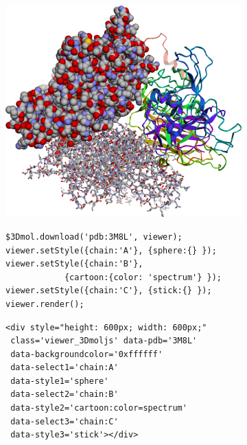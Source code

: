 \documentclass[]{bioinfo}
\begin{document}
\begin{figure}
        \captionsetup[subfigure]{aboveskip=-1pt}
\centering
\begin{minipage}[b]{.9\linewidth}
\begin{subfigure}[b]{\linewidth} \centering
\includegraphics[width=\linewidth]{screenshot}
\caption{}\label{pic}
\end{subfigure} %
\end{minipage}
\begin{minipage}[b]{\linewidth}
\begin{subfigure}[b]{\linewidth} \centering
\begin{verbatim}
$3Dmol.download('pdb:3M8L', viewer);
viewer.setStyle({chain:'A'}, {sphere:{} });
viewer.setStyle({chain:'B'}, 
            {cartoon:{color: 'spectrum'} });
viewer.setStyle({chain:'C'}, {stick:{} });
viewer.render();
\end{verbatim}
\caption{}\label{code}
\end{subfigure} %
\begin{subfigure}[b]{\linewidth} \centering
\begin{verbatim}
<div style="height: 600px; width: 600px;" 
 class='viewer_3Dmoljs' data-pdb='3M8L'
 data-backgroundcolor='0xffffff'  
 data-select1='chain:A'
 data-style1='sphere'
 data-select2='chain:B'
 data-style2='cartoon:color=spectrum'
 data-select3='chain:C'
 data-style3='stick'></div>
\end{verbatim}
\caption{}\label{embed}

\end{subfigure}
\end{minipage}
\end{figure}
\end{document}
